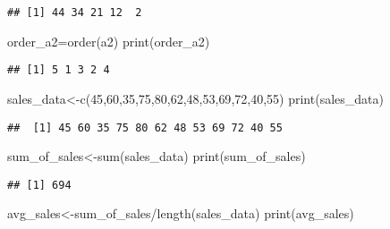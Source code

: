 \documentclass[
]{article}
\newenvironment{Shaded}{\begin{snugshade}}{\end{snugshade}}
\newcommand{\DecValTok}[1]{\textcolor[rgb]{0.00,0.00,0.81}{#1}}
\newcommand{\FunctionTok}[1]{\textcolor[rgb]{0.00,0.00,0.00}{#1}}
\newcommand{\NormalTok}[1]{#1}
\newcommand{\OtherTok}[1]{\textcolor[rgb]{0.56,0.35,0.01}{#1}}
\newcommand{\SpecialCharTok}[1]{\textcolor[rgb]{0.00,0.00,0.00}{#1}}
\begin{document}
\begin{verbatim}
## [1] 44 34 21 12  2
\end{verbatim}

\begin{Shaded}
\begin{Highlighting}[]
\NormalTok{order\_a2}\OtherTok{=}\FunctionTok{order}\NormalTok{(a2)}
\FunctionTok{print}\NormalTok{(order\_a2)}
\end{Highlighting}
\end{Shaded}

\begin{verbatim}
## [1] 5 1 3 2 4
\end{verbatim}

\begin{Shaded}
\begin{Highlighting}[]
\NormalTok{sales\_data}\OtherTok{\textless{}{-}}\FunctionTok{c}\NormalTok{(}\DecValTok{45}\NormalTok{,}\DecValTok{60}\NormalTok{,}\DecValTok{35}\NormalTok{,}\DecValTok{75}\NormalTok{,}\DecValTok{80}\NormalTok{,}\DecValTok{62}\NormalTok{,}\DecValTok{48}\NormalTok{,}\DecValTok{53}\NormalTok{,}\DecValTok{69}\NormalTok{,}\DecValTok{72}\NormalTok{,}\DecValTok{40}\NormalTok{,}\DecValTok{55}\NormalTok{)}
\FunctionTok{print}\NormalTok{(sales\_data)}
\end{Highlighting}
\end{Shaded}

\begin{verbatim}
##  [1] 45 60 35 75 80 62 48 53 69 72 40 55
\end{verbatim}

\begin{Shaded}
\begin{Highlighting}[]
\NormalTok{sum\_of\_sales}\OtherTok{\textless{}{-}}\FunctionTok{sum}\NormalTok{(sales\_data)}
\FunctionTok{print}\NormalTok{(sum\_of\_sales)}
\end{Highlighting}
\end{Shaded}

\begin{verbatim}
## [1] 694
\end{verbatim}

\begin{Shaded}
\begin{Highlighting}[]
\NormalTok{avg\_sales}\OtherTok{\textless{}{-}}\NormalTok{sum\_of\_sales}\SpecialCharTok{/}\FunctionTok{length}\NormalTok{(sales\_data)}
\FunctionTok{print}\NormalTok{(avg\_sales)}
\end{Highlighting}
\end{Shaded}
\end{document}
